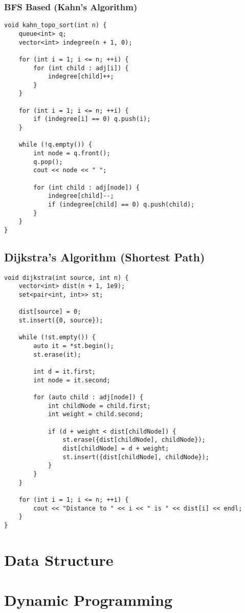 \documentclass{article}
\begin{document}
\subsubsection{BFS Based (Kahn's Algorithm)}
\begin{verbatim}
void kahn_topo_sort(int n) {
    queue<int> q;
    vector<int> indegree(n + 1, 0);

    for (int i = 1; i <= n; ++i) {
        for (int child : adj[i]) {
            indegree[child]++;
        }
    }

    for (int i = 1; i <= n; ++i) {
        if (indegree[i] == 0) q.push(i);
    }

    while (!q.empty()) {
        int node = q.front();
        q.pop();
        cout << node << " ";

        for (int child : adj[node]) {
            indegree[child]--;
            if (indegree[child] == 0) q.push(child);
        }
    }
}
\end{verbatim}
\subsection{Dijkstra's Algorithm (Shortest Path)}
\begin{verbatim}
void dijkstra(int source, int n) {
    vector<int> dist(n + 1, 1e9);
    set<pair<int, int>> st;

    dist[source] = 0;
    st.insert({0, source});

    while (!st.empty()) {
        auto it = *st.begin();
        st.erase(it);

        int d = it.first;
        int node = it.second;

        for (auto child : adj[node]) {
            int childNode = child.first;
            int weight = child.second;

            if (d + weight < dist[childNode]) {
                st.erase({dist[childNode], childNode});
                dist[childNode] = d + weight;
                st.insert({dist[childNode], childNode});
            }
        }
    }

    for (int i = 1; i <= n; ++i) {
        cout << "Distance to " << i << " is " << dist[i] << endl;
    }
}

\end{verbatim}


\section{Data Structure}

\section{Dynamic Programming}
\end{document}
